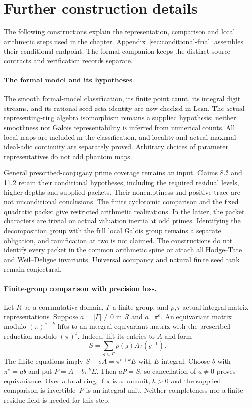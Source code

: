 \documentclass[11pt]{article}
\theoremstyle{definition}
\theoremstyle{remark}
\begin{document}
\section*{Further construction details}
The following constructions explain the representation, comparison and local
arithmetic steps used in the chapter. Appendix~\ref{sec:conditional-final}
assembles their conditional endpoint. The formal companion keeps the distinct
source contracts and verification records separate.

\paragraph{The formal model and its hypotheses.}

The smooth formal-model classification, its finite point count, its integral digit streams, and its rational seed zeta identity are now checked in Lean. The actual representing-ring algebra isomorphism remains a supplied hypothesis; neither smoothness nor Galois representability is inferred from numerical counts. All local maps are included in the classification, and locality and actual maximal-ideal-adic continuity are separately proved. Arbitrary choices of parameter representatives do not add phantom maps.

General prescribed-conjugacy prime coverage remains an input. Claims 8.2
and 11.2 retain their conditional hypotheses, including the required residual
levels, higher depths and supplied packets. Their nonemptiness and positive
trace are not unconditional conclusions. The finite cyclotomic comparison and
the fixed quadratic packet give restricted arithmetic realizations. In the
latter, the packet characters are trivial on actual valuation inertia at odd
primes. Identifying the decomposition group with the full local Galois group
remains a separate obligation, and ramification at two is not claimed.
The constructions do not identify every packet in the common arithmetic spine
or attach all Hodge--Tate and Weil--Deligne invariants. Universal occupancy and
natural finite seed rank remain conjectural.

\paragraph{Finite-group comparison with precision loss.}\label{book:x-construction-17}
Let $R$ be a commutative domain, $\Gamma$ a finite group, and $\rho,\tau$
actual integral matrix representations. Suppose $a=|\Gamma|\ne0$ in $R$ and
$a\mid\pi^e$. An equivariant matrix modulo $(\pi)^{e+k}$ lifts to an
integral equivariant matrix with the prescribed reduction modulo $(\pi)^k$.
Indeed, lift its entries to $A$ and form
\[
S=\sum_{g\in\Gamma}\rho(g)A\tau(g^{-1}).
\]
The finite equations imply $S-aA=\pi^{e+k}E$ with $E$ integral. Choose $b$
with $\pi^e=ab$ and put $P=A+b\pi^kE$. Then $aP=S$, so cancellation of
$a\ne0$ proves equivariance. Over a local ring, if $\pi$ is a nonunit,
$k>0$ and the supplied comparison is invertible, $P$ is an integral unit.
Neither completeness nor a finite residue field is needed for this step.
\end{document}
